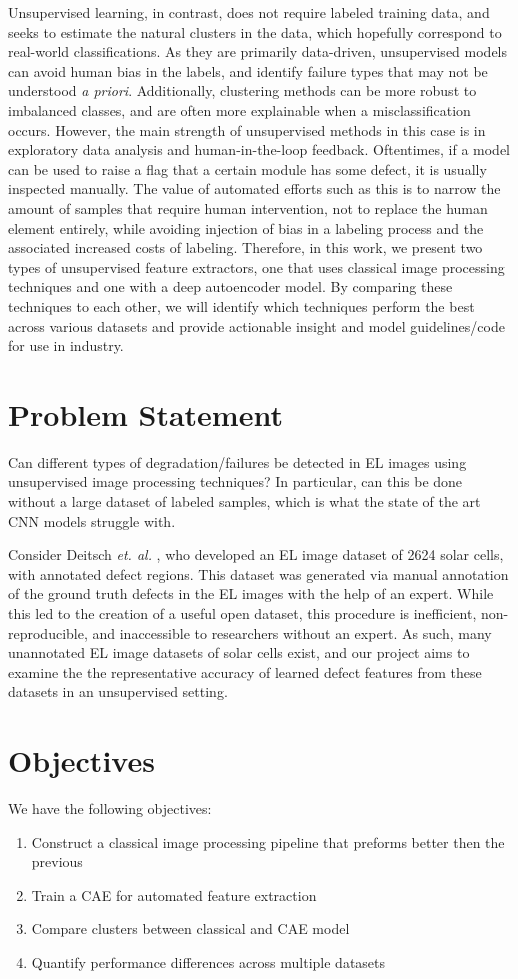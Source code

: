 \documentclass[12pt]{article}
\begin{document}
Unsupervised learning, in contrast, does not require labeled training data, and seeks to estimate the natural clusters in the data, which hopefully correspond to real-world classifications. 
As they are primarily data-driven, unsupervised models can avoid human bias in the labels, and identify failure types that may not be understood \textit{a priori}. 
Additionally, clustering methods can be more robust to imbalanced classes, and are often more explainable when a misclassification occurs. 
However, the main strength of unsupervised methods in this case is in exploratory data analysis and human-in-the-loop feedback. 
Oftentimes, if a model can be used to raise a flag that a certain module has some defect, it is usually inspected manually. 
The value of automated efforts such as this is to narrow the amount of samples that require human intervention, not to replace the human element entirely, while avoiding injection of bias in a labeling process and the associated increased costs of labeling. 
Therefore, in this work, we present two types of unsupervised feature extractors, one that uses classical image processing techniques and one with a deep autoencoder model. 
By comparing these techniques to each other, we will identify which techniques perform the best across various datasets and provide actionable insight and model guidelines/code for use in industry. 


\section{Problem Statement}
Can different types of degradation/failures be detected in EL images using unsupervised image processing techniques? 
In particular, can this be done without a large dataset of labeled samples, which is what the state of the art CNN models struggle with. 

Consider Deitsch \textit{et. al.} \cite{deitsch_automatic_2019}, who developed an EL image dataset of 2624 solar cells, with annotated defect regions. 
This dataset was generated via manual annotation of the ground truth defects in the EL images with the help of an expert. 
While this led to the creation of a useful open dataset, this procedure is inefficient, non-reproducible, and inaccessible to researchers without an expert. 
As such, many unannotated EL image datasets of solar cells exist, and our project aims to examine the the representative accuracy of learned defect features from these datasets in an unsupervised setting.

\section{Objectives}
We have the following objectives:
\begin{enumerate}
    \item Construct a classical image processing pipeline that preforms better then the previous
    \item Train a CAE for automated feature extraction
    \item Compare clusters between classical and CAE model
    \item Quantify performance differences across multiple datasets
\end{enumerate}
\end{document}
